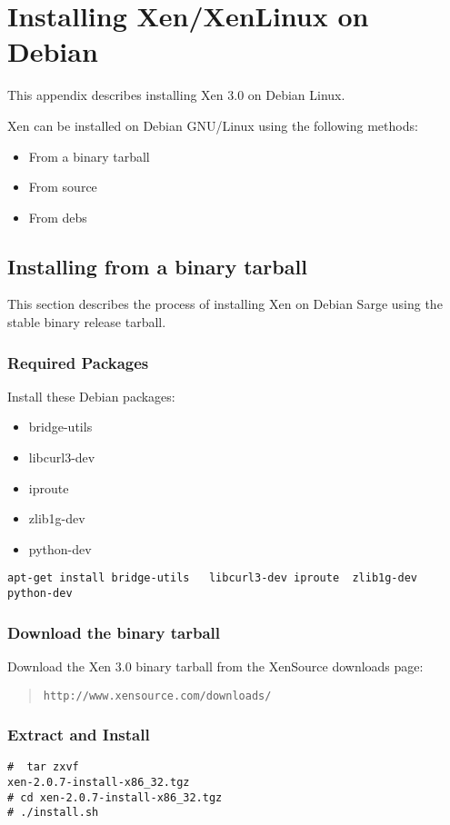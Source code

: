 \chapter{Installing Xen/XenLinux on Debian}

This appendix describes installing Xen 3.0 on Debian Linux.

Xen can be installed on Debian GNU/Linux using the following methods:

\begin{itemize}
\item From a binary tarball
\item From source 
\item From debs
\end{itemize}

\section{Installing from a binary tarball}
This section describes the process of installing Xen on Debian Sarge using the stable binary release tarball.

\subsection{Required Packages}
Install these Debian packages:

\begin{itemize}
\item bridge-utils
\item libcurl3-dev
\item iproute
\item zlib1g-dev
\item python-dev
\end{itemize}

\begin{verbatim}
apt-get install bridge-utils   libcurl3-dev iproute  zlib1g-dev python-dev
\end{verbatim}


\subsection{Download the binary tarball}
Download the Xen 3.0 binary tarball from the XenSource downloads
page:

\begin{quote} {\tt http://www.xensource.com/downloads/}
\end{quote}
 
\subsection{Extract and Install}
\begin{verbatim}
#  tar zxvf 
xen-2.0.7-install-x86_32.tgz
# cd xen-2.0.7-install-x86_32.tgz
# ./install.sh
\end{verbatim}

